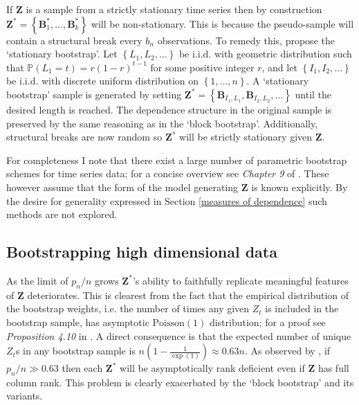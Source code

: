 \documentclass[11pt]{report}\usepackage[utf8]{inputenc}
\begin{document}
If $\boldsymbol{Z}$ is a sample from a strictly stationary time series then by construction $\boldsymbol{Z}^* = \left \{ \boldsymbol{B}_1^*,..., \boldsymbol{B}_k^*\right \}$ will be non-stationary. This is because the pseudo-sample will contain a structural break every $b_n$ observations. To remedy this, \cite{politis1994stationary} propose the `stationary bootstrap'. Let $\left \{ L_1, L_2,... \right \}$ be $\text{i.i.d.}$ with geometric distribution such that $\mathbb{P}\left ( L_1 = t \right ) = r\left ( 1-r \right )^{t-1}$ for some positive integer $r$, and let $\left \{ I_1, I_2,... \right \}$ be $\text{i.i.d.}$ with discrete uniform distribution on $\left \{ 1,...,n \right \}$. A `stationary bootstrap' sample is generated by setting  $\boldsymbol{Z}^{*} =\left \{ \boldsymbol{B}_{I_1,L_1},\boldsymbol{B}_{I_2,L_2},... \right \}$ until the desired length is reached. The dependence structure in the original sample is preserved by the same reasoning as in the `block bootstrap'. Additionally, structural breaks are now random so $\boldsymbol{Z}^{*}$ will be strictly stationary given $\boldsymbol{Z}$.  

For completeness I note that there exist a large number of parametric bootstrap schemes for time series data; for a concise overview see \textit{Chapter 9} of \cite{shao2012jackknife}. These however assume that the form of the model generating $\boldsymbol{Z}$ is known explicitly. By the desire for generality expressed in Section \ref{measures of dependence} such methods are not explored. 

\subsection{Bootstrapping high dimensional data}

As the limit of $p_n/n$ grows $\boldsymbol{Z}^*$'s ability to faithfully replicate meaningful features of $\boldsymbol{Z}$ deteriorates. This is clearest from the fact that the empirical distribution of the bootstrap weights, i.e. the number of times any given $Z_t$ is included in the bootstrap sample, has  asymptotic $\text{Poisson}(1)$ distribution; for a proof see \textit{Proposition 4.10} in \cite{el2010high}. A direct consequence is that the expected number of unique $Z_t$s in any bootstrap sample is $n\left ( 1-\frac{1}{\exp(1)} \right ) \approx 0.63 n$. As observed by \cite{karoui2016can}, if $p_n/n \gg 0.63$ then each $\boldsymbol{Z}^*$ will be asymptotically rank deficient even if $\boldsymbol{Z}$ has full column rank. This problem is clearly exacerbated by the `block bootstrap' and its variants. 
\end{document}

